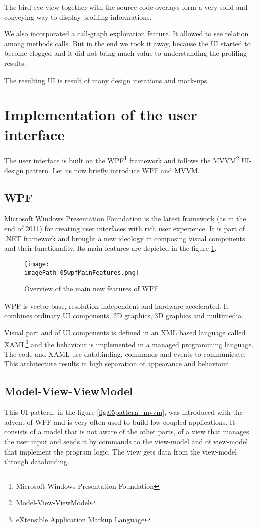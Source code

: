 The bird-eye view together with the source code overlays form a very solid and conveying way to display profiling informations. 

We also incorporated a call-graph exploration feature. It allowed to see relation among methods calls. But in the end we took it away, because the UI started to become clogged and it did not bring much value to understanding the profiling results. 

The resulting UI is result of many design iterations and mock-ups.

\section{Implementation of the user interface}
The user interface is built on the WPF\footnote{Microsoft Windows Presentation Foundation} framework \cite{WPF4Unleashed} and follows the MVVM\footnote{Model-View-ViewModel} \cite{MVVM2011} UI-design pattern. Let us now briefly introduce WPF and MVVM.

\subsection{WPF}
Microsoft Windows Presentation Foundation is the latest framework (as in the end of 2011) for creating user interfaces with rich user experience. It is part of .NET framework and brought a new ideology in composing visual components and their functionality. Its main features are depicted in the figure \ref{fig:05wpfMainFeatures}.

\begin{figure}
	\centering
		\texttt{[image: \\imagePath 05wpfMainFeatures.png]}
		\caption{Overview of the main new features of WPF \cite{WPFpage}}
	\label{fig:05wpfMainFeatures}
\end{figure}

WPF is vector base, resolution independent and hardware accelerated. It combines ordinary UI components, 2D graphics, 3D graphics and multimedia. 

Visual part and of UI components is defined in an XML based language called \linebreak XAML\footnote{eXtensible Application Markup Language} and the behaviour is implemented in a managed programming language. The code and XAML use databinding, commands and events to communicate. This architecture results in high separation of appearance and behaviour.

\subsection{Model-View-ViewModel}
This UI pattern, in the figure \ref{fig:05pattern_mvvm}, was introduced with the advent of WPF and is very often used to build low-coupled applications. It consists of a model that is not aware of the other parts, of a view that manages the user input and sends it by commands to the view-model and of view-model that implement the program logic. The view gets data from the view-model through databinding.

